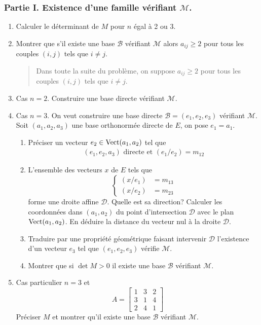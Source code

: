 \subsubsection*{Partie I. Existence d'une famille vérifiant $\mathcal M$.}
\begin{enumerate}
 \item Calculer le déterminant de $M$ pour $n$ égal à 2 ou 3.
\item Montrer que s'il existe une base $\mathcal B$ vérifiant $\mathcal M$ alors $a_{ij}\geq 2$ pour tous les couples $(i,j)$ tels que $i\neq j$.
\begin{quote}
  Dans toute la suite du problème, on suppose $a_{ij}\geq 2$ pour tous les couples $(i,j)$ tels que $i\neq j$.
\end{quote}
\item Cas $n=2$. Construire une base directe vérifiant $\mathcal M$.
\item Cas $n=3$. On veut  construire une base directe $\mathcal{B}=(e_1,e_2,e_3)$ vérifiant $\mathcal M$. Soit $(a_1,a_2,a_3)$ une base orthonormée directe de $E$, on pose $e_1=a_1$.
\begin{enumerate}
 \item Préciser un vecteur $e_2\in\operatorname{Vect} (a_1,a_2)$ tel que
\begin{align*}
 (e_1,e_2,a_3)  \text{ directe et }
 (e_1/e_2)=m_{12} 
\end{align*}

\item L'ensemble des vecteurs $x$ de $E$ tels que
\begin{displaymath}
 \left\lbrace 
\begin{aligned}
 (x/e_1) &= m_{13}\\
 (x/e_2) &= m_{23}
\end{aligned}
\right. 
\end{displaymath}
forme une droite affine $\mathcal D$.\newline
Quelle est sa direction? Calculer les coordonnées dans $(a_1,a_2)$ du point d'intersection $\mathcal D$ avec le plan $\operatorname{Vect} (a_1,a_2)$. En déduire la distance du vecteur nul à la droite $\mathcal D$.
\item Traduire par une propriété géométrique faisant intervenir $\mathcal D$ l'existence d'un vecteur $e_3$ tel que $(e_1,e_2,e_3)$ vérifie $\mathcal M$.
\item Montrer que si $\det M >0$ il existe une base $\mathcal B$ vérifiant $\mathcal M$.
\end{enumerate}
\item Cas particulier $n=3$ et
\begin{displaymath}
 A= \begin{bmatrix}
 1 & 3 & 2 \\
3 & 1 & 4 \\
2 & 4 & 1
\end{bmatrix}
\end{displaymath}
Préciser $M$ et montrer qu'il existe une base $\mathcal B$ vérifiant $\mathcal M$.
\end{enumerate}

